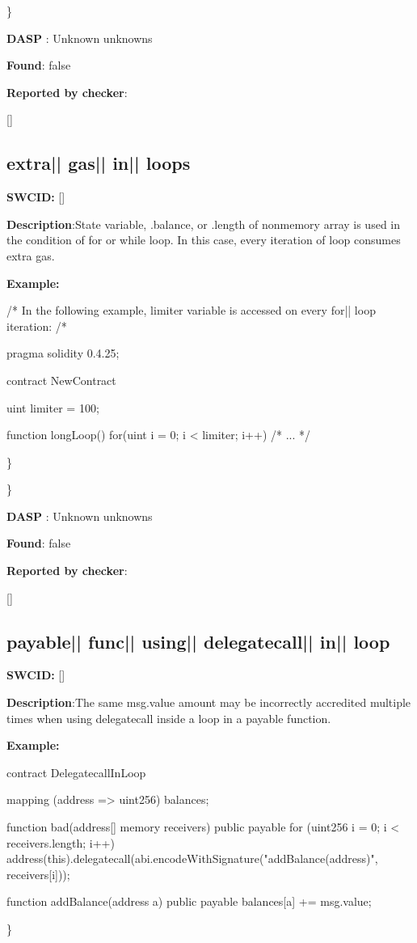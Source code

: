\documentclass{article}
\begin{document}
\} 

\textbf{DASP} : Unknown unknowns

\textbf{Found}: false

\textbf{Reported by checker}: 
\begin{ffcode} 

[]
\end{ffcode} 
\subsection{extra{|\textunderscore| }gas{|\textunderscore| }in{|\textunderscore| }loops} 
\textbf{SWC{\textunderscore }ID:} []

\textbf{Description}:State variable, .balance, or .length of non{\textendash}memory array is used in the condition of for or while loop. In this case, every iteration of loop consumes extra gas.


\textbf{Example:} 
\begin{ffcode} 

/* In the following example, limiter variable is accessed on every for|\textendash| loop iteration: /* 

pragma solidity 0.4.25;

contract NewContract {
    uint limiter = 100;

    function longLoop() {
        for(uint i = 0; i < limiter; i++) {
            /* ... */
        }
    }
}

\end{ffcode} 
\} 

\} 

\textbf{DASP} : Unknown unknowns

\textbf{Found}: false

\textbf{Reported by checker}: 
\begin{ffcode} 

[]
\end{ffcode} 
\subsection{payable{|\textunderscore| }func{|\textunderscore| }using{|\textunderscore| }delegatecall{|\textunderscore| }in{|\textunderscore| }loop} 
\textbf{SWC{\textunderscore }ID:} []

\textbf{Description}:The same msg.value amount may be incorrectly accredited multiple times when using delegatecall inside a loop in a payable function.


\textbf{Example:} 
\begin{ffcode} 

contract DelegatecallInLoop{

    mapping (address => uint256) balances;

    function bad(address[] memory receivers) public payable {
        for (uint256 i = 0; i < receivers.length; i++) {
            address(this).delegatecall(abi.encodeWithSignature("addBalance(address)", receivers[i]));
        }
    }

    function addBalance(address a) public payable {
        balances[a] += msg.value;
    }
}

\end{ffcode} 
\} 
\end{document}
